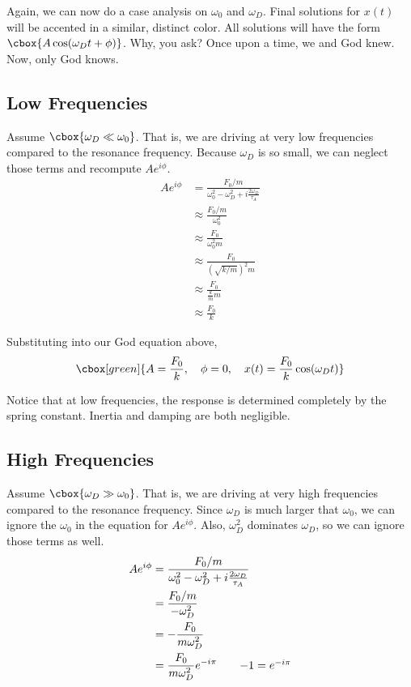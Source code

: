 \documentclass{hw}
\begin{document}
Again, we can now do a case analysis on $\omega_0$ and $\omega_D$. Final
solutions for $x(t)$ will be accented in a similar, distinct color. All
solutions will have the form $\cbox{A \cos(\omega_D t + \phi)}$. Why, you ask?
Once upon a time, we and God knew. Now, only God knows.

\subsection{Low Frequencies}
Assume $\cbox{\omega_D \ll \omega_0}$. That is, we are driving at very low
frequencies compared to the resonance frequency. Because $\omega_D$ is so
small, we can neglect those terms and recompute $Ae^{i\phi}$.
\begin{align*}
  Ae^{i\phi} &= \frac{F_0/m}{\omega_0^2 - \omega_D^2  + i \frac{2\omega_D}{\tau_A}} \\
             &\approx \frac{F_0/m}{\omega_0^2} \\
             &\approx \frac{F_0}{\omega_0^2 m} \\
             &\approx \frac{F_0}{(\sqrt{k/m})^2 m} \\
             &\approx \frac{F_0}{\frac{k}{m} m} \\
             &\approx \frac{F_0}{k} 
\end{align*}

Substituting into our God equation above,
\[\cbox[green]{
  A = \frac{F_0}{k}, \quad \phi = 0, \quad x(t) = \frac{F_0}{k}\cos(\omega_D t)
}\]

Notice that at low frequencies, the response is determined completely by the
spring constant. Inertia and damping are both negligible.

\subsection{High Frequencies}
Assume $\cbox{\omega_D \gg \omega_0}$. That is, we are driving at very high
frequencies compared to the resonance frequency. Since $\omega_D$ is much
larger that $\omega_0$, we can ignore the $\omega_0$ in the equation for $Ae^{i
\phi}$. Also, $\omega_D^2$ dominates $\omega_D$, so we can ignore those terms
as well.
\begin{align*}
  Ae^{i\phi} &= \frac{F_0/m}{\omega_0^2 - \omega_D^2  + i \frac{2\omega_D}{\tau_A}} \\
             &= \frac{F_0/m}{-\omega_D^2} \\
             &= -\frac{F_0}{m\omega_D^2} \\
             &= \frac{F_0}{m\omega_D^2} e^{-i\pi} \tag*{$-1 = e^{-i\pi}$}
\end{align*}
\end{document}
